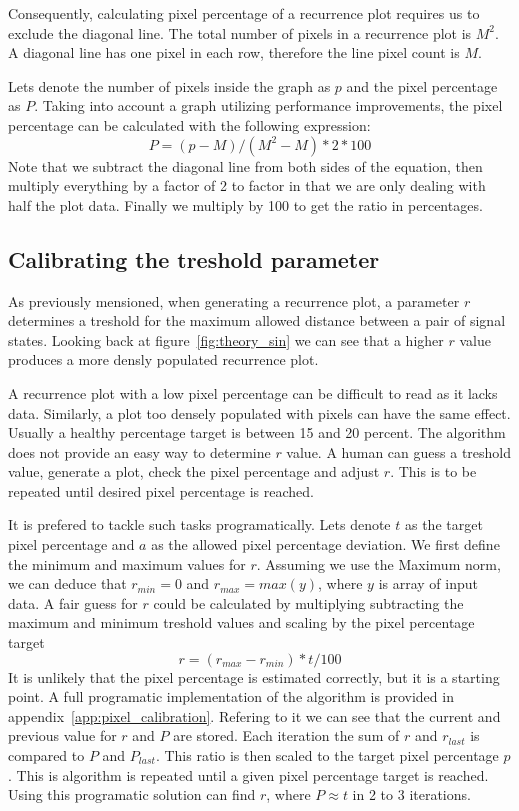 \documentclass[a4paper,12pt,fleqn]{article}
\begin{document}
Consequently, calculating pixel percentage of a recurrence plot requires us to exclude the diagonal line.
The total number of pixels in a recurrence plot is $M^2$.
A diagonal line has one pixel in each row, therefore the line pixel count is $M$.

Lets denote the number of pixels inside the graph as $p$ and the pixel percentage as $P$.
Taking into account a graph utilizing performance improvements, the pixel percentage can be calculated with the following expression:
\[
  P = (p-M)/(M^2-M)*2*100
\]
Note that we subtract the diagonal line from both sides of the equation, then multiply everything by a factor of 2 to factor in that we are only dealing with half the plot data.
Finally we multiply by 100 to get the ratio in percentages.


\subsection{Calibrating the treshold parameter}
\label{sec:calibrating-threshold}
As previously mensioned, when generating a recurrence plot, a parameter $r$ determines a treshold for the maximum allowed distance between a pair of signal states.
Looking back at figure~\ref{fig:theory_sin} we can see that a higher $r$ value produces a more densly populated recurrence plot.

A recurrence plot with a low pixel percentage can be difficult to read as it lacks data.
Similarly, a plot too densely populated with pixels can have the same effect.
Usually a healthy percentage target is between 15 and 20 percent.
The algorithm does not provide an easy way to determine $r$ value.
A human can guess a treshold value, generate a plot, check the pixel percentage and adjust $r$.
This is to be repeated until desired pixel percentage is reached.

It is prefered to tackle such tasks programatically.
Lets denote $t$ as the target pixel percentage and $a$ as the allowed pixel percentage deviation.
We first define the minimum and maximum values for $r$.
Assuming we use the Maximum norm, we can deduce that $r_{min}=0$ and $r_{max}=max(y)$, where $y$ is array of input data.
A fair guess for $r$ could be calculated by multiplying subtracting the maximum and minimum treshold values and scaling by the pixel percentage target
\[r=(r_{max}-r_{min})*t/100\]
It is unlikely that the pixel percentage is estimated correctly, but it is a starting point.
A full programatic implementation of the algorithm is provided in appendix~\ref{app:pixel_calibration}.
Refering to it we can see that the current and previous value for $r$ and $P$ are stored.
Each iteration the sum of $r$ and $r_{last}$ is compared to $P$ and $P_{last}$.
This ratio is then scaled to the target pixel percentage $p$.
This is algorithm is repeated until a given pixel percentage target is reached.
Using this programatic solution can find $r$, where $P≈t$ in 2 to 3 iterations.
\end{document}
